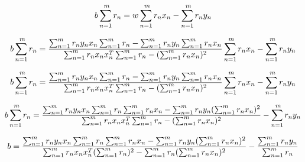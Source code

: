 \documentclass[a4paper]{article}
\begin{document}
$$b \sum_{n=1}^{\\m} r_n = w \sum_{n=1}^{\\m}r_n x_n - \sum_{n=1}^{\\m} r_n y_n$$

$$b \sum_{n=1}^{\\m} r_n = \frac{\sum_{n=1}^{\\m} r_n y_n x_n \sum_{n=1}^{\\m} r_n - \sum_{n=1}^{\\m} r_n y_n \sum_{n=1}^{\\m} r_n x_n}{\sum_{n=1}^{\\m}r_n x_n x_n^T \sum_{n=1}^{\\m} r_n - ({\sum_{n=1}^{\\m}r_n x_n})^2} \sum_{n=1}^{\\m}r_n x_n - \sum_{n=1}^{\\m} r_n y_n$$

$$b \sum_{n=1}^{\\m} r_n = \frac{\sum_{n=1}^{\\m} r_n y_n x_n \sum_{n=1}^{\\m} r_n - \sum_{n=1}^{\\m} r_n y_n \sum_{n=1}^{\\m} r_n x_n}{\sum_{n=1}^{\\m}r_n x_n x_n^T \sum_{n=1}^{\\m} r_n - ({\sum_{n=1}^{\\m}r_n x_n})^2} \sum_{n=1}^{\\m}r_n x_n - \sum_{n=1}^{\\m} r_n y_n$$

$$b \sum_{n=1}^{\\m} r_n = \frac{\sum_{n=1}^{\\m} r_n y_n x_n \sum_{n=1}^{\\m} r_n \sum_{n=1}^{\\m}r_n x_n - \sum_{n=1}^{\\m} r_n y_n (\sum_{n=1}^{\\m} r_n x_n)^2}{\sum_{n=1}^{\\m}r_n x_n x_n^T \sum_{n=1}^{\\m} r_n - ({\sum_{n=1}^{\\m}r_n x_n})^2} - \sum_{n=1}^{\\m} r_n y_n$$

\begin{equation}
\label{cf_b}
b = \frac{\sum_{n=1}^{\\m} r_n y_n x_n \sum_{n=1}^{\\m} r_n \sum_{n=1}^{\\m}r_n x_n - \sum_{n=1}^{\\m} r_n y_n (\sum_{n=1}^{\\m} r_n x_n)^2}{\sum_{n=1}^{\\m}r_n x_n x_n^T (\sum_{n=1}^{\\m} r_n)^2 - \sum_{n=1}^{\\m} r_n ({\sum_{n=1}^{\\m}r_n x_n})^2} - \frac{\sum_{n=1}^{\\m} r_n y_n}{\sum_{n=1}^{\\m} r_n}
\end{equation}
\end{document}
